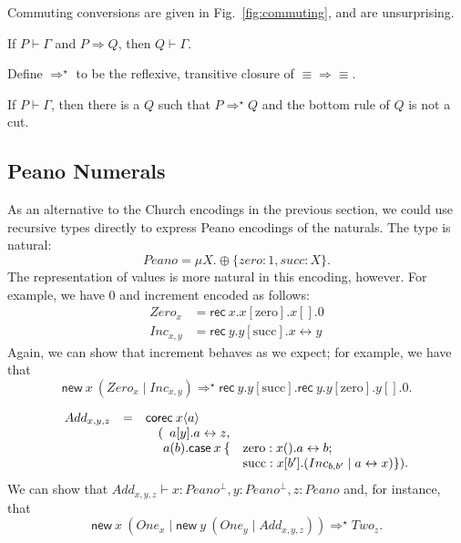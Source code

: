 \documentclass[orivec,envcountsame]{llncs}
\newcommand{\cpdual}[1]{#1^\perp}
\newcommand{\cptyp}[2]{#1 \vdash #2}
\newcommand{\mkwd}[1]{\mathsf{#1}}
\newcommand{\link}[2]{#1 \leftrightarrow #2}
\newcommand{\cut}[4]{\mkwd{new}\:#1 \: (#3 \mid #4)}
\newcommand{\rec}[1]{\mkwd{rec}\:#1}
\newcommand{\clabel}[1]{\mathrm{#1}}
\newcommand{\sel}[2]{#1[\clabel{#2}]}
\begin{document}
Commuting conversions are given in Fig.~\ref{fig:commuting}, and are unsurprising.

\begin{theorem}
  If $\cptyp{P}{\Gamma}$ and $P \Longrightarrow Q$, then $\cptyp{Q}{\Gamma}.$
\end{theorem}

Define $\Longrightarrow^\star$ to be the reflexive, transitive closure of $\equiv\Longrightarrow\equiv$.

\begin{theorem}
  If $\cptyp{P}{\Gamma}$, then there is a $Q$ such that $P \Longrightarrow^\star Q$ and the bottom
  rule of $Q$ is not a cut.
\end{theorem}

\subsection{Peano Numerals}

As an alternative to the Church encodings in the previous section, we could use recursive types
directly to express Peano encodings of the naturals.  The type is natural:
%
{\small\[
  Peano = \mu X.\oplus\{zero: 1, succ: X\}.
\]}
%
The representation of values is more natural in this encoding, however.  For example, we have 0 and
increment encoded as follows:
%
{\small\begin{align*}
  Zero_x &= \rec{x}.\sel{x}{zero}.x[].0 \\
  Inc_{x,y} &= \rec{y}.\sel{y}{succ}.\link{x}{y}
\end{align*}}
Again, we can show that increment behaves as we expect; for example, we have that
%
{\small\[
  \cut{x}{Peano}{Zero_x}{Inc_{x,y}} \Longrightarrow^\star \rec{y}.\sel{y}{succ}.\rec{y}.\sel{y}{zero}.y[].0.
\]}

{\small\[\begin{array}{rcl@{\hspace{0mm}}ll}
  Add_{x,y,z} & = & \mcl{3}{\mkwd{corec}\:x\langle a \rangle} \\
  & & \quad (&\mcl{2}{a[y].\link{a}{z},} \\
  & & & a(b).\mkwd{case}\:x\:\{&\clabel{zero}: x().\link{a}{b}; \\
  & & & & \clabel{succ}: x[b'].(Inc_{b,b'} \mid  \link{a}{x}) \}).
\end{array}\]}
We can show that $\cptyp{Add_{x,y,z}}{x:\cpdual{Peano}, y:\cpdual{Peano}, z:Peano}$ and, for instance,
that
%
{\small\[
  \cut{x}{Peano}{One_x}{\cut{y}{Peano}{One_y}{Add_{x,y,z}}} \Longrightarrow^\star Two_z.
\]}
\end{document}
